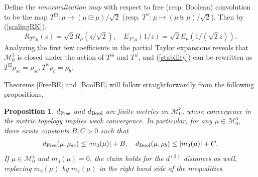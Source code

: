\documentclass{amsart}
\newtheorem{proposition}[theorem]{Proposition}
\theoremstyle{definition}
\theoremstyle{remark}
\numberwithin{equation}{section}
\begin{document}
Define the \textit{renormalization map} with respect to free (resp. Boolean) convolution to be the map $T^{\boxplus}: \mu\mapsto (\mu\boxplus \mu)/\sqrt{2}$ (resp. $T^{\uplus}: \mu\mapsto (\mu\uplus \mu)/\sqrt{2}$). 
Then by (\ref{scalingRK}), $$R_{T^{\boxplus}\mu}(z)=\sqrt{2}R_\mu(z/\sqrt{2}),\quad E_{T^{\uplus}\mu}(1/z)=\sqrt{2}E_\mu(1/(\sqrt{2}z)).$$
Analyzing the first few coefficients in the partial Taylor expansions reveals that $\mathcal{M}_0^3$ is closed under the action of $T^\boxplus$ and $T^\uplus$, and (\ref{stability}) can be rewritten as $ T^{\boxplus}\rho_{sc} =\rho_{sc}, T^{\uplus}\rho_b = \rho_b.$


Theorems \ref{FreeBE} and \ref{BoolBE} will follow straightforwardly from the following propositions.

\begin{proposition}\label{qe:finite1d}
    $d_{\text{\normalfont Free}}$ and $d_{\text{\normalfont Bool}}$ are finite metrics on $\mathcal{M}_0^3$, where convergence in the metric topology implies weak convergence.
    In particular, for any $\mu\in \mathcal{M}_0^3$, there exists constants $B, C>0$ such that
    \begin{align}\label{bound}
         d_{\text{\normalfont Free}}(\mu, \rho_{sc})\leq |m_3(\mu)|+B,\quad d_{\text{\normalfont Bool}}(\mu, \rho_b)\leq |m_3(\mu)|+C.
    \end{align}
    If $\mu\in \mathcal{M}_0^{4}$ and $m_3(\mu)=0$, the claim holds for the $d^{(3)}$ distances as well, replacing $m_3(\mu)$ by $m_4(\mu)$ in the right hand side of the inequalities.
\end{proposition}
\end{document}
